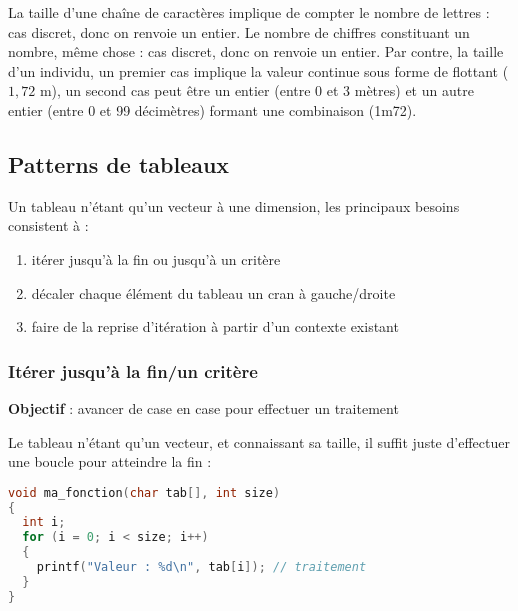\documentclass[11pt,a4paper]{article}
\begin{document}
\medskip

La taille d'une chaîne de caractères implique de compter le nombre de lettres : cas discret, donc on renvoie un entier.
Le nombre de chiffres constituant un nombre, même chose : cas discret, donc on renvoie un entier.
Par contre, la taille d'un individu, un premier cas implique la valeur continue sous forme de flottant ($1,72$ m), un second cas peut être un entier (entre 0 et 3 mètres) et un autre entier (entre 0 et 99 décimètres) formant une combinaison (1m72).


\clearpage

\subsection{Patterns de tableaux}

Un tableau n'étant qu'un vecteur à une dimension, les principaux besoins consistent à :

\begin{enumerate}
\item itérer jusqu'à la fin ou jusqu'à un critère
\item décaler chaque élément du tableau un cran à gauche/droite
\item faire de la reprise d'itération à partir d'un contexte existant
\end{enumerate}

\medskip

\subsubsection{Itérer jusqu'à la fin/un critère}

\textbf{Objectif} : avancer de case en case pour effectuer un traitement

\bigskip

Le tableau n'étant qu'un vecteur, et connaissant sa taille, il suffit juste d'effectuer une boucle pour atteindre la fin :

\medskip

\begin{lstlisting}[language=C]
void ma_fonction(char tab[], int size)
{
  int i;
  for (i = 0; i < size; i++)
  {
    printf("Valeur : %d\n", tab[i]); // traitement
  }
} \end{lstlisting}

\end{document}
